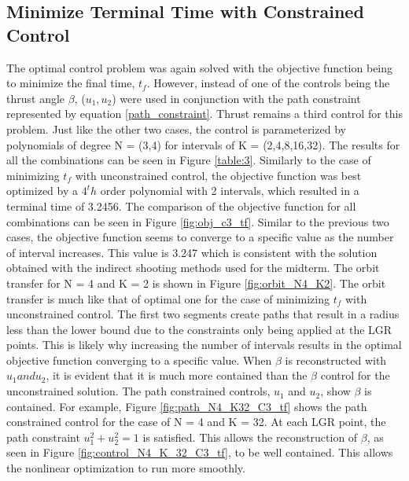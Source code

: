 \documentclass[]{article}
\begin{document}
	\subsection{Minimize Terminal Time with Constrained Control}
	 The optimal control problem was again solved with the objective function being to minimize the final time, \(t_f\). However, instead of one of the controls being the thrust angle \(\beta\), (\(u_1,u_2\)) were used in conjunction with the path constraint represented by equation \ref{path_constraint}. Thrust remains a third control for this problem. Just like the other two cases, the control is parameterized by polynomials of degree N = (3,4) for intervals of K = (2,4,8,16,32). The results for all the combinations can be seen in Figure \ref{table:3}. Similarly to the case of minimizing \(t_f\) with unconstrained control, the objective function was best optimized by a \(4^th\) order polynomial with 2 intervals, which resulted in a terminal time of 3.2456. The comparison of the objective function for all combinations can be seen in Figure \ref{fig:obj_c3_tf}. Similar to the previous two cases, the objective function seems to converge to a specific value as the number of interval increases. This value is 3.247 which is consistent with the solution obtained with the indirect shooting methods used for the midterm. The orbit transfer for N = 4 and K = 2 is shown in Figure \ref{fig:orbit_N4_K2}. The orbit transfer is much like that of optimal one for the case of minimizing \(t_f\) with unconstrained control. The first two segments create paths that result in a radius less than the lower bound due to the constraints only being applied at the LGR points. This is likely why increasing the number of intervals results in the optimal objective function converging to a specific value. When \(\beta\) is reconstructed with \(u_1 and u_2\), it is evident that it is much more contained than the \(\beta\) control for the unconstrained solution. The path constrained controls, \(u_1\) and \(u_2\), show \(\beta\) is contained. For example, Figure \ref{fig:path_N4_K32_C3_tf} shows the path constrained control for the case of N = 4 and K = 32. At each LGR point, the path constraint \(u_1^2 + u_2^2 = 1\) is satisfied. This allows the reconstruction of \(\beta\), as seen in Figure \ref{fig:control_N4_K_32_C3_tf}, to be well contained. This allows the nonlinear optimization to run more smoothly.
\end{document}
